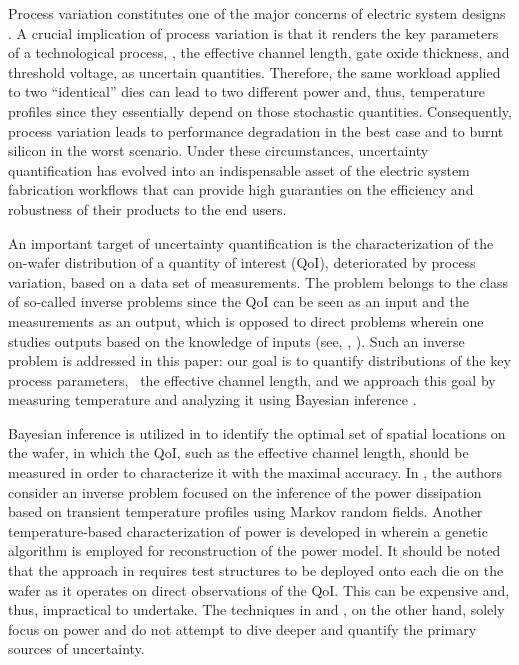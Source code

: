 Process variation constitutes one of the major concerns of electric system designs \cite{srivastava2010}. A crucial implication of process variation is that it renders the key parameters of a technological process, \eg, the effective channel length, gate oxide thickness, and threshold voltage, as uncertain quantities.
Therefore, the same workload applied to two ``identical'' dies can lead to two different power and, thus, temperature profiles since they essentially depend on those stochastic quantities. Consequently, process variation leads to performance degradation in the best case and to burnt silicon in the worst scenario.
Under these circumstances, uncertainty quantification has evolved into an indispensable asset of the electric system fabrication workflows that can provide high guaranties on the efficiency and robustness of their products to the end users.

An important target of uncertainty quantification is the characterization of the on-wafer distribution of a quantity of interest (QoI), deteriorated by process variation, based on a data set of measurements.
The problem belongs to the class of so-called inverse problems since the QoI can be seen as an input and the measurements as an output, which is opposed to direct problems wherein one studies outputs based on the knowledge of inputs (see, \eg, \cite{juan2011, juan2012}).
Such an inverse problem is addressed in this paper: our goal is to quantify distributions of the key process parameters, \eg\ the effective channel length, and we approach this goal by measuring temperature and analyzing it using Bayesian inference \cite{gelman2004}.

Bayesian inference is utilized in \cite{zhang2010} to identify the optimal set of spatial locations on the wafer, in which the QoI, such as the effective channel length, should be measured in order to characterize it with the maximal accuracy.
In \cite{paek2012}, the authors consider an inverse problem focused on the inference of the power dissipation based on transient temperature profiles using Markov random fields.
Another temperature-based characterization of power is developed in \cite{mesa-martinez2007} wherein a genetic algorithm is employed for reconstruction of the power model.
It should be noted that the approach in \cite{zhang2010} requires test structures to be deployed onto each die on the wafer as it operates on direct observations of the QoI. This can be expensive and, thus, impractical to undertake. The techniques in \cite{paek2012} and \cite{mesa-martinez2007}, on the other hand, solely focus on power and do not attempt to dive deeper and quantify the primary sources of uncertainty.

